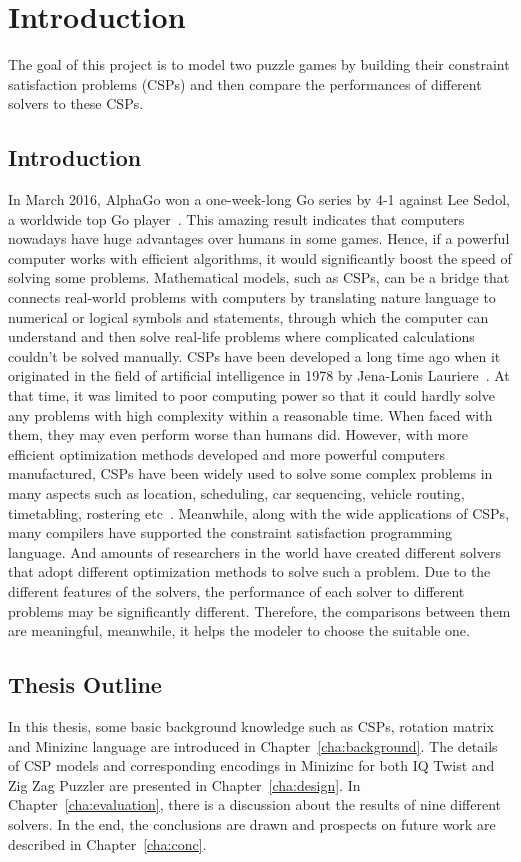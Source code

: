 \chapter{Introduction}
\label{cha:intro}
The goal of this project is to model two puzzle games by building their constraint satisfaction problems (CSPs) and then compare the performances of different solvers to these CSPs.
\section{Introduction}
\label{sec:introduction}
In March 2016, AlphaGo won a one-week-long Go series by 4-1 against Lee Sedol, a worldwide top Go player~\cite{r26}. This amazing result indicates that computers nowadays have huge advantages over humans in some games. Hence, if a powerful computer works with efficient algorithms, it would significantly boost the speed of solving some problems. Mathematical models, such as CSPs, can be a bridge that connects real-world problems with computers by translating nature language to numerical or logical symbols and statements, through which the computer can understand and then solve real-life problems where complicated calculations couldn’t be solved manually. CSPs have been developed a long time ago when it originated in the field of artificial intelligence in 1978 by Jena-Lonis Lauriere~\cite{r27}. At that time, it was limited to poor computing power so that it could hardly solve any problems with high complexity within a reasonable time. When faced with them, they may even perform worse than humans did. However, with more efficient optimization methods developed and more powerful computers manufactured, CSPs have been widely used to solve some complex problems in many aspects such as location, scheduling, car sequencing, vehicle routing, timetabling, rostering etc~\cite{r28}. Meanwhile, along with the wide applications of CSPs, many compilers have supported the constraint satisfaction programming language. And amounts of researchers in the world have created different solvers that adopt different optimization methods to solve such a problem. Due to the different features of the solvers, the performance of each solver to different problems may be significantly different. Therefore, the comparisons between them are meaningful, meanwhile, it helps the modeler to choose the suitable one.
\section{Thesis Outline}
\label{sec:outline}
In this thesis, some basic background knowledge such as CSPs, rotation matrix and Minizinc language are introduced in Chapter~\ref{cha:background}. The details of CSP models and corresponding encodings in Minizinc for both IQ Twist and Zig Zag Puzzler are presented in Chapter~\ref{cha:design}. In Chapter~\ref{cha:evaluation}, there is a discussion about the results of nine different solvers. In the end, the conclusions are drawn and prospects on future work are described in Chapter~\ref{cha:conc}.
